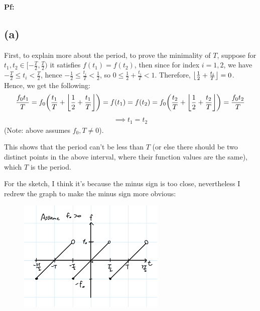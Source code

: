 \documentclass{article}
\DeclarePairedDelimiter{\paran}{(}{)}%
\DeclarePairedDelimiter{\floor}{\lfloor}{\rfloor}
\begin{document}
\textbf{Pf:}
\subsection*{(a)}
First, to explain more about the period, to prove the minimality of $T$, suppose for $t_1,t_2 \in [-\frac{T}{2},\frac{T}{2})$ it satisfies $f(t_1)=f(t_2)$, then since for index $i=1,2$, we have $-\frac{T}{2}\leq t_i < \frac{T}{2}$, hence $-\frac{1}{2}\leq \frac{t_i}{T}<\frac{1}{2}$, so $0\leq \frac{1}{2}+\frac{t_i}{T}<1$. Therefore, $\floor*{\frac{1}{2}+\frac{t_i}{T}}=0$. Hence, we get the following:
\begin{align}
    \frac{f_0t_1}{T}=f_0\paran*{\frac{t_1}{T}+\floor*{\frac{1}{2}+\frac{t_1}{T}}}=f(t_1)=f(t_2)=f_0\paran*{\frac{t_2}{T}+\floor*{\frac{1}{2}+\frac{t_2}{T}}}=\frac{f_0t_2}{T}
\end{align}
\begin{align}
    \implies t_1=t_2
\end{align}
(Note: above assumes $f_0, T\neq 0$).

This shows that the period can't be less than $T$ (or else there should be two distinct points in the above interval, where their function values are the same), which $T$ is the period.

\hfil

For the sketch, I think it's because the minus sign is too close, nevertheless I redrew the graph to make the minus sign more obvious:
\begin{figure}[h!]
    \begin{center}
        \includegraphics[width=70mm]{q4a.jpg}
    \end{center}
\end{figure}
\end{document}
